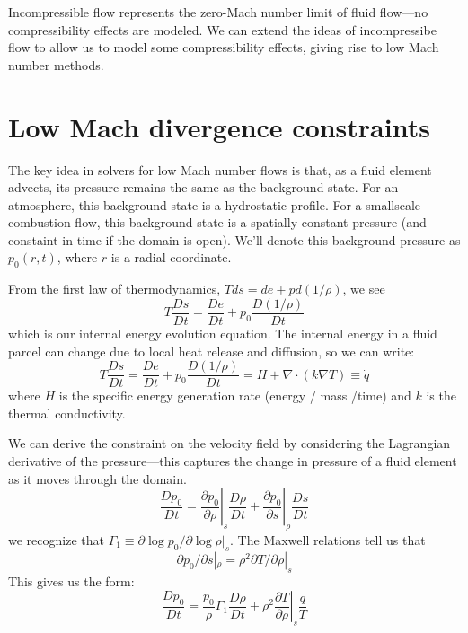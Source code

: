 \newcommand{\teta}{\tilde{\eta}}

Incompressible flow represents the zero-Mach number limit of fluid
flow---no compressibility effects are modeled.  We can extend the
ideas of incompressibe flow to allow us to model some compressibility
effects, giving rise to low Mach number methods.

\section{Low Mach divergence constraints}

The key idea in solvers for low Mach number flows is that, as a fluid
element advects, its pressure remains the same as the background
state.  For an atmosphere, this background state is a hydrostatic
profile.  For a smallscale combustion flow, this background state is a
spatially constant pressure (and constaint-in-time if the domain is
open).  We'll denote this background pressure as $p_0(r,t)$, where 
$r$ is a radial coordinate.

From the first law of thermodynamics, $Tds = de + pd(1/\rho)$, we see
\begin{equation}
T \frac{Ds}{Dt} = \frac{De}{Dt} + p_0 \frac{D(1/\rho)}{Dt}
\end{equation}
which is our internal energy evolution equation.  The internal
energy in a fluid parcel can change due to local heat release and 
diffusion, so we can write:
\begin{equation}
T \frac{Ds}{Dt} = \frac{De}{Dt} + p_0 \frac{D(1/\rho)}{Dt} = H +
\nabla \cdot (k \nabla T) \equiv \dot{q}
\end{equation}
where $H$ is the specific energy generation rate (energy / mass /time)
and $k$ is the thermal conductivity.

We can derive the constraint on the velocity field by considering the
Lagrangian derivative of the pressure---this captures the change in
pressure of a fluid element as it moves through the domain.
\begin{equation}
\frac{Dp_0}{Dt} = \left . \frac{\partial p_0}{\partial \rho} \right |_s
     \frac{D\rho}{Dt} +
     \left . \frac{\partial p_0}{\partial s} \right |_\rho
     \frac{Ds}{Dt}
\end{equation}
we recognize that $\Gamma_1 \equiv \partial \log p_0/\partial \log \rho |_s$.
The Maxwell relations tell us that
\begin{equation}
\partial p_0/\partial s |_\rho = \rho^2 \partial T/\partial \rho |_s
\end{equation}
This gives us the form:
\begin{equation}
\frac{Dp_0}{Dt} = \frac{p_0}{\rho} \Gamma_1 \frac{D\rho}{Dt} +
     \left . \rho^2 \frac{\partial T}{\partial \rho} \right |_s
     \frac{\dot{q}}{T}
\end{equation}

